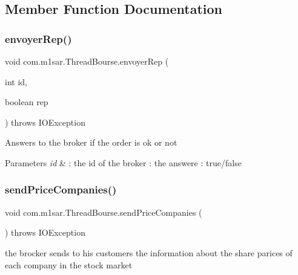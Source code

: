\subsection{Member Function Documentation}
\mbox{\label{classcom_1_1m1sar_1_1_thread_bourse_a431e283fa57268481834f67709b7ec07}} 
\subsubsection{\texorpdfstring{envoyer\+Rep()}{envoyerRep()}}
{\footnotesize\ttfamily void com.\+m1sar.\+Thread\+Bourse.\+envoyer\+Rep (\begin{DoxyParamCaption}\item[{int}]{id,  }\item[{boolean}]{rep }\end{DoxyParamCaption}) throws I\+O\+Exception}

Answers to the broker if the order is ok or not 
\begin{DoxyParams}{Parameters}
{\em id} & \+: the id of the broker  \+: the answere \+: true/false \\
\hline
\end{DoxyParams}
\mbox{\label{classcom_1_1m1sar_1_1_thread_bourse_acea1b4e4e2757b3cc82bba756eda4057}} 
\subsubsection{\texorpdfstring{send\+Price\+Companies()}{sendPriceCompanies()}}
{\footnotesize\ttfamily void com.\+m1sar.\+Thread\+Bourse.\+send\+Price\+Companies (\begin{DoxyParamCaption}{ }\end{DoxyParamCaption}) throws I\+O\+Exception}

the brocker sends to his customers the information about the share parices of each company in the stock market \mbox{\label{classcom_1_1m1sar_1_1_thread_bourse_a714db4602cd1dff9a732caf861b1d5e6}} 
